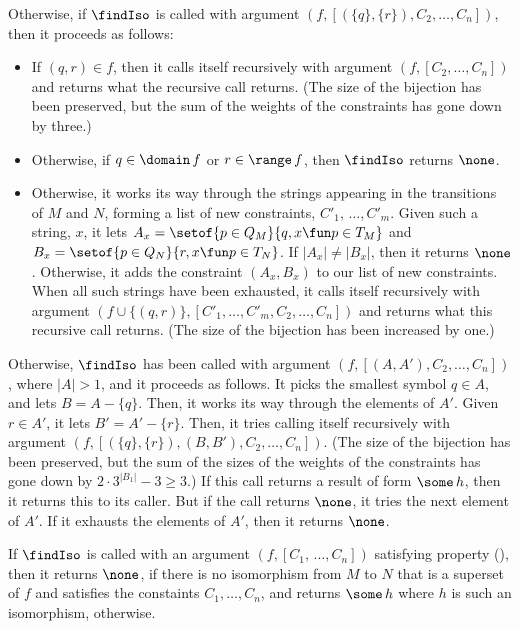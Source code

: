 Otherwise, if $\findIso$ is called with argument $(f, [(\{q\},\{r\}),
C_2,\ldots,C_n])$, then it proceeds as follows:
\begin{itemize}
\item If $(q,r)\in f$, then it calls itself recursively with argument
  $(f,[C_2,\ldots,C_n])$ and returns what the recursive call returns.
  (The size of the bijection has been preserved, but the sum of the
  weights of the constraints has gone down by three.)

\item Otherwise, if $q\in\domain\,f$ or $r\in\range\,f$, then
  $\findIso$ returns $\none$.

\item Otherwise, it works its way through the strings appearing in the
  transitions of $M$ and $N$, forming a list of new constraints,
  $C'_1,\,\ldots,C'_m$.  Given such a string, $x$, it lets
  $A_x=\setof{p\in Q_M}{q,x\fun p\in T_M}$ and $B_x=\setof{p\in
    Q_N}{r,x\fun p\in T_N}$.  If $|A_x|\neq|B_x|$, then it returns
  $\none$.  Otherwise, it adds the constraint $(A_x,B_x)$ to our
  list of new constraints.  When all such strings have been exhausted,
  it calls itself recursively with argument $(f \cup \{(q,r)\},
  [C'_1,\ldots,C'_m,C_2,\ldots,C_n])$ and returns what this recursive
  call returns.  (The size of the bijection has been increased by
  one.)
\end{itemize}

Otherwise, $\findIso$ has been called with argument $(f, [(A, A'),
C_2, \ldots, C_n])$, where $|A|>1$, and it proceeds as follows.  It
picks the smallest symbol $q\in A$, and lets $B=A-\{q\}$.  Then,
it works its way through the elements of $A'$.  Given $r\in A'$, it
lets $B'=A'-\{r\}$.  Then, it tries calling itself recursively with
argument $(f, [(\{q\},\{r\}), (B,B'), C_2,\ldots, C_n])$.  (The
size of the bijection has been preserved, but the sum of the sizes of
the weights of the constraints has gone down by $2\cdot
3^{|B_1|}-3\geq 3$.)  If this call returns a result of form $\some\,h$,
then it returns this to its caller.  But if the call returns $\none$, it
tries the next element of $A'$.  If it exhausts the elements of $A'$,
then it returns $\none$.

\begin{lemma}
\label{FindIsoLem}
If $\findIso$ is called with an argument $(f,[C_1,\,\ldots,C_n])$ satisfying
property (\dag), then it returns $\none$, if there is no isomorphism
from $M$ to $N$ that is a superset of $f$ and satisfies the constaints
$C_1,\ldots,C_n$, and returns $\some\,h$ where $h$ is such an isomorphism,
otherwise.
\end{lemma}

